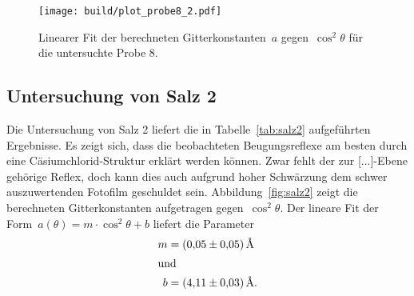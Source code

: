 \begin{figure}[htb]
  \centering
  \texttt{[image: build/plot\_probe8\_2.pdf]}
  \caption{Linearer Fit der berechneten Gitterkonstanten~$a$
  gegen~$\cos^2\theta$ für die untersuchte Probe 8.}
  \label{fig:probe8}
\end{figure}

\subsection{Untersuchung von Salz 2}

Die Untersuchung von Salz 2 liefert die in Tabelle~\ref{tab:salz2}
aufgeführten Ergebnisse. Es zeigt sich, dass die beobachteten Beugungsreflexe
am besten durch eine Cäsiumchlorid-Struktur erklärt werden können. Zwar fehlt
der zur [...]-Ebene gehörige Reflex, doch kann dies auch aufgrund hoher
Schwärzung dem schwer auszuwertenden Fotofilm geschuldet sein.
Abbildung~\ref{fig:salz2} zeigt die berechneten Gitterkonstanten aufgetragen
gegen~$\cos^2{\theta}$. Der lineare Fit der
Form~$a(\theta)=m\cdot\cos^2{\theta}+b$ liefert die Parameter
%
\begin{align}
  m&=\SI{0.05(5)}{\angstrom} \\
  \shortintertext{und}
  b&=\SI{4.11(3)}{\angstrom}. %
\end{align}

